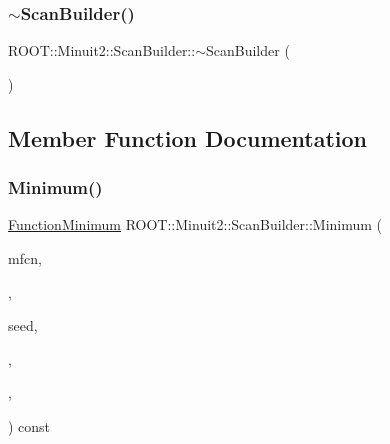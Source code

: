 \mbox{\label{classROOT_1_1Minuit2_1_1ScanBuilder_a9255e1e6791d3b627872e285b0a7156c}} 
\subsubsection{\texorpdfstring{$\sim$ScanBuilder()}{~ScanBuilder()}\hspace{0.1cm}{\footnotesize\ttfamily [3/3]}}
{\footnotesize\ttfamily R\+O\+O\+T\+::\+Minuit2\+::\+Scan\+Builder\+::$\sim$\+Scan\+Builder (\begin{DoxyParamCaption}{ }\end{DoxyParamCaption})\hspace{0.3cm}{\ttfamily [inline]}}



\subsection{Member Function Documentation}
\mbox{\label{classROOT_1_1Minuit2_1_1ScanBuilder_ad53e9711dc8a63958845ac6e6eb5250f}} 
\subsubsection{\texorpdfstring{Minimum()}{Minimum()}\hspace{0.1cm}{\footnotesize\ttfamily [1/3]}}
{\footnotesize\ttfamily \mbox{\hyperlink{classROOT_1_1Minuit2_1_1FunctionMinimum}{Function\+Minimum}} R\+O\+O\+T\+::\+Minuit2\+::\+Scan\+Builder\+::\+Minimum (\begin{DoxyParamCaption}\item[{const \mbox{\hyperlink{classROOT_1_1Minuit2_1_1MnFcn}{Mn\+Fcn}} \&}]{mfcn,  }\item[{const \mbox{\hyperlink{classROOT_1_1Minuit2_1_1GradientCalculator}{Gradient\+Calculator}} \&}]{,  }\item[{const \mbox{\hyperlink{classROOT_1_1Minuit2_1_1MinimumSeed}{Minimum\+Seed}} \&}]{seed,  }\item[{const \mbox{\hyperlink{classROOT_1_1Minuit2_1_1MnStrategy}{Mn\+Strategy}} \&}]{,  }\item[{unsigned int}]{,  }\item[{double}]{ }\end{DoxyParamCaption}) const\hspace{0.3cm}{\ttfamily [virtual]}}



